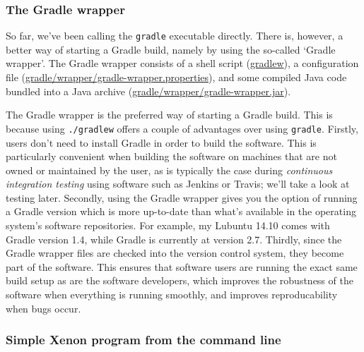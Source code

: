 \subsubsection{The Gradle wrapper}


So far, we've been calling the \texttt{gradle} executable directly. There is, however, a better way of starting a Gradle build, namely by using the so-called `Gradle wrapper'. The Gradle wrapper consists of a shell script (\url{gradlew}), a configuration file (\url{gradle/wrapper/gradle-wrapper.properties}), and some compiled Java code bundled into a Java archive (\url{gradle/wrapper/gradle-wrapper.jar}).

The Gradle wrapper is the preferred way of starting a Gradle build. This is because using \texttt{./gradlew} offers a couple of advantages over using \texttt{gradle}.
%
Firstly, users don't need to install Gradle in order to build the software. This is particularly convenient when  building the software on machines that are not owned or maintained by the user, as is typically the case during \textit{continuous integration testing} using software such as Jenkins or Travis; we'll take a look at testing later.
%
Secondly, using the Gradle wrapper gives you the option of running a Gradle version which is more up-to-date than what's available in the operating system's software repositories. For example, my Lubuntu 14.10 comes with Gradle version 1.4, while Gradle is currently at version 2.7.
%
Thirdly, since the Gradle wrapper files are checked into the version control system, they become part of the software. This ensures that software users are running the exact same build setup as are the software developers, which improves the robustness of the software when everything is running smoothly, and improves reproducability when bugs occur.










\subsubsection{Simple Xenon program from the command line}


